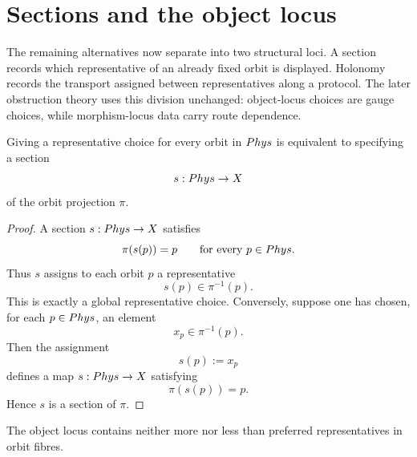 \section{Sections and the object locus}
The remaining alternatives now separate into two structural loci.  A
section records which representative of an already fixed orbit is
displayed.  Holonomy records the transport assigned between
representatives along a protocol.  The later obstruction theory uses this
division unchanged: object-locus choices are gauge choices, while
morphism-locus data carry route dependence.

\begin{proposition}
	Giving a representative choice for every orbit in \(Phys\) is
	equivalent to specifying a section
	\[
		s:Phys\to X
	\]
	of the orbit projection \(\pi\).
\end{proposition}
\begin{proof}
	A section \(s:Phys\to X\) satisfies
	\[
		\pi(s(p))=p
		\qquad
		\text{for every }p\in Phys.
	\]
	Thus \(s\) assigns to each orbit \(p\) a representative
	\[
		s(p)\in \pi^{-1}(p).
	\]
	This is exactly a global representative choice.
	Conversely, suppose one has chosen, for each \(p\in Phys\), an element
	\[
		x_p\in \pi^{-1}(p).
	\]
	Then the assignment
	\[
		s(p):=x_p
	\]
	defines a map \(s:Phys\to X\) satisfying
	\[
		\pi(s(p))=p.
	\]
	Hence \(s\) is a section of \(\pi\).
\end{proof}
\begin{remark}
	The object locus contains neither more nor less than preferred
	representatives in orbit fibres.
\end{remark}
